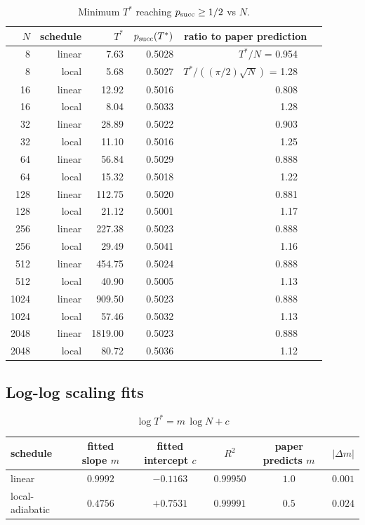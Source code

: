\documentclass[11pt]{article}
\begin{document}
\begin{table}[h]\centering\small
\begin{tabular}{rrrrrrr}
\toprule
$N$ & schedule & $T^{\ast}$ & $p_{\rm succ}(T^{\ast})$ & \multicolumn{2}{c}{ratio to paper prediction} \\
\midrule
 8 & linear & 7.63 & 0.5028 & $T^{\ast}/N$ = 0.954 & \\
 8 & local  & 5.68 & 0.5027 & $T^{\ast}/((\pi/2)\sqrt N)$ = 1.28 & \\
16 & linear & 12.92 & 0.5016 & 0.808 & \\
16 & local  & 8.04  & 0.5033 & 1.28 & \\
32 & linear & 28.89 & 0.5022 & 0.903 & \\
32 & local  & 11.10 & 0.5016 & 1.25 & \\
64 & linear & 56.84 & 0.5029 & 0.888 & \\
64 & local  & 15.32 & 0.5018 & 1.22 & \\
128& linear & 112.75 & 0.5020 & 0.881 & \\
128& local  & 21.12  & 0.5001 & 1.17 & \\
256& linear & 227.38 & 0.5023 & 0.888 & \\
256& local  & 29.49  & 0.5041 & 1.16 & \\
512& linear & 454.75 & 0.5024 & 0.888 & \\
512& local  & 40.90  & 0.5005 & 1.13 & \\
1024& linear & 909.50 & 0.5023 & 0.888 & \\
1024& local  & 57.46  & 0.5032 & 1.13 & \\
2048& linear & 1819.00 & 0.5023 & 0.888 & \\
2048& local  & 80.72   & 0.5036 & 1.12 & \\
\bottomrule
\end{tabular}
\caption{Minimum $T^{\ast}$ reaching $p_{\rm succ}\ge 1/2$ vs $N$.}
\end{table}

\subsection{Log-log scaling fits}
\[
  \log T^{\ast} = m\,\log N + c
\]
\begin{center}\small
\begin{tabular}{lccccc}
\toprule
schedule & fitted slope $m$ & fitted intercept $c$ & $R^2$ & paper predicts $m$ & $|\Delta m|$ \\
\midrule
linear         & $0.9992$ & $-0.1163$ & $0.99950$ & $1.0$ & $0.001$ \\
local-adiabatic& $0.4756$ & $+0.7531$ & $0.99991$ & $0.5$ & $0.024$ \\
\bottomrule
\end{tabular}
\end{center}
\end{document}
